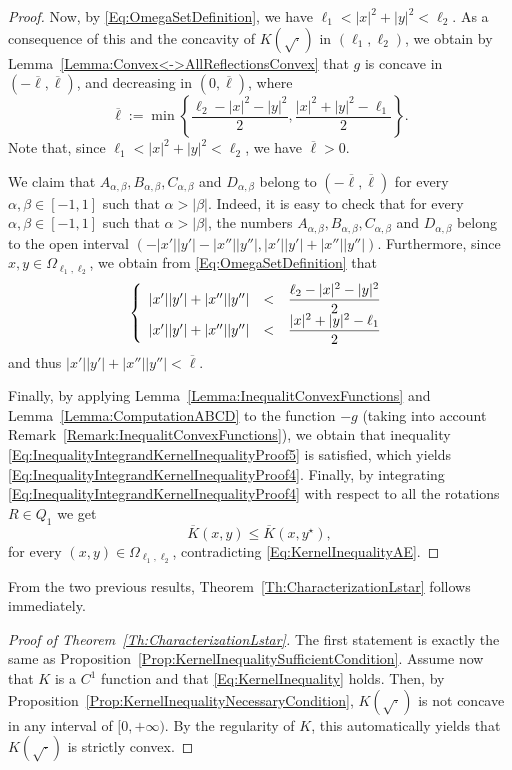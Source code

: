 \begin{proof}
Now, by \eqref{Eq:OmegaSetDefinition}, we have $\ell_1 < |x|^2+|y|^2 <\ell_2$. As a consequence of this and the concavity of $K(\sqrt{\cdot})$ in $(\ell_1,\ell_2)$, we obtain by Lemma~\ref{Lemma:Convex<->AllReflectionsConvex} that $g$ is concave in $ \left( -\overline{\ell}, \overline{\ell}\right) $, and decreasing in $(0,\overline{\ell})$, where 
$$
\overline{\ell} := \min{\left\{\frac{\ell_2-|x|^2-|y|^2}{2},\frac{|x|^2+|y|^2-\ell_1}{2}\right\}}.$$
Note that, since $\ell_1 < |x|^2+|y|^2 <\ell_2$, we have $\overline{\ell}>0$.


We claim that $A_{\alpha,\beta}, B_{\alpha,\beta}, C_{\alpha,\beta}$ and $D_{\alpha,\beta}$ belong to $(-\overline{\ell},\overline{\ell})$ for every $\alpha, \beta \in [-1,1]$ such that $\alpha>|\beta|$. Indeed, it is easy to check that for every $\alpha, \beta \in [-1,1]$ such that $\alpha>|\beta|$, the numbers $A_{\alpha,\beta}, B_{\alpha,\beta}, C_{\alpha,\beta}$ and $D_{\alpha,\beta}$ belong to the open interval $(-|x'||y'|-|x''||y''|,|x'||y'|+|x''||y''|)$. Furthermore, since $x,y \in \Omega_{\ell_1,\ell_2}$, we obtain from \eqref{Eq:OmegaSetDefinition} that
$$
\left\{\begin{array}{rcll}
|x'||y'|+|x''||y''|&<&\dfrac{\ell_2-|x|^2-|y|^2}{2}\\
|x'||y'|+|x''||y''|&<&\dfrac{|x|^2+|y|^2-\ell_1}{2}
\end{array} \right. 
$$
and thus $ |x'||y'|+|x''||y''|<\overline{\ell}$.

Finally, by applying Lemma~\ref{Lemma:InequalitConvexFunctions} and Lemma~\ref{Lemma:ComputationABCD} to the function $-g$ (taking into account Remark~\ref{Remark:InequalitConvexFunctions}), we obtain that inequality \eqref{Eq:InequalityIntegrandKernelInequalityProof5} is satisfied, which yields \eqref{Eq:InequalityIntegrandKernelInequalityProof4}. Finally, by integrating \eqref{Eq:InequalityIntegrandKernelInequalityProof4} with respect to all the rotations $R\in Q_1$ we get $$ \overline{K}(x,y) \leq \overline{K}(x, y^\star),$$ for every $(x,y)\in \Omega_{\ell_1,\ell_2}$, contradicting \eqref{Eq:KernelInequalityAE}.
\end{proof}

From the two previous results, Theorem~\ref{Th:CharacterizationLstar} follows immediately.

\begin{proof}[Proof of Theorem~\ref{Th:CharacterizationLstar}]
	The first statement is exactly the same as Proposition~\ref{Prop:KernelInequalitySufficientCondition}. Assume now that $K$ is a $C^1$ function and that \eqref{Eq:KernelInequality} holds. Then, by Proposition~\ref{Prop:KernelInequalityNecessaryCondition}, $K(\sqrt{\cdot})$ is not concave in any interval of $[0,+\infty)$. By the regularity of $K$, this automatically yields that $K(\sqrt{\cdot})$ is strictly convex.
\end{proof}

